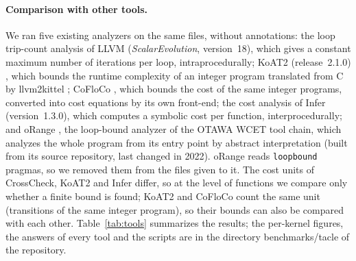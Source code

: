 \documentclass[oneside,english]{amsart}
\numberwithin{equation}{section}
\numberwithin{figure}{section}
\theoremstyle{plain}
\theoremstyle{definition}
\theoremstyle{plain}
\theoremstyle{remark}
\theoremstyle{plain}
\theoremstyle{definition}
\theoremstyle{plain}
\theoremstyle{remark}
\newcommand{\lean}[1]{{\ttfamily\small #1}}
\begin{document}
\paragraph{Comparison with other tools.}
We ran five existing analyzers on the same files, without annotations: the loop trip-count analysis of LLVM \cite{lattner2004llvm} (\emph{ScalarEvolution}, version~18), which gives a constant maximum number of iterations per loop, intraprocedurally; KoAT2 (release~2.1.0) \cite{brockschmidt2016analyzing,lommen2022automatic}, which bounds the runtime complexity of an integer program translated from C by llvm2kittel \cite{falke2011termination}; CoFloCo \cite{floresmontoya2014cofloco}, which bounds the cost of the same integer programs, converted into cost equations by its own front-end; the cost analysis of Infer \cite{infercost} (version~1.3.0), which computes a symbolic cost per function, interprocedurally; and oRange \cite{demichiel2008orange}, the loop-bound analyzer of the OTAWA WCET tool chain, which analyzes the whole program from its entry point by abstract interpretation (built from its source repository, last changed in 2022). oRange reads \texttt{loopbound} pragmas, so we removed them from the files given to it. The cost units of CrossCheck, KoAT2 and Infer differ, so at the level of functions we compare only whether a finite bound is found; KoAT2 and CoFloCo count the same unit (transitions of the same integer program), so their bounds can also be compared with each other. Table~\ref{tab:tools} summarizes the results; the per-kernel figures, the answers of every tool and the scripts are in the directory \lean{benchmarks/tacle} of the repository.
\end{document}
